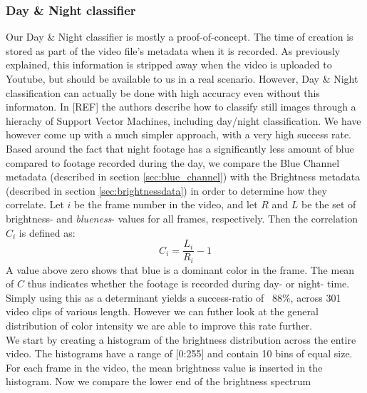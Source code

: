 \subsubsection{Day \& Night classifier}\label{sec:daynightclassifier}
%
Our Day \& Night classifier is mostly a proof-of-concept. The time of creation is stored as part of the video file's metadata when it is recorded. As previously explained, this information is stripped away when the video is uploaded to Youtube, but should be available to us in a real scenario. However, Day \& Night classification can actually be done with high accuracy even without this informaton. In [REF] the authors describe how to classify still images through a hierachy of Support Vector Machines, including day/night classification. We have however come up with a much simpler approach, with a very high success rate.\\
Based around the fact that night footage has a significantly less amount of blue compared to footage recorded during the day, we compare the Blue Channel metadata (described in section \ref{sec:blue_channel}) with the Brightness metadata (described in section \ref{sec:brightnessdata}) in order to determine how they correlate. Let $i$ be the frame number in the video, and let $R$ and $L$ be the set of brightness- and \textit{blueness}- values for all frames, respectively. Then the correlation $C_{i}$ is defined as:\\
%
\begin{equation}
C_{i} = \frac{L_{i}}{R_{i}} - 1
\end{equation}
%
A value above zero shows that blue is a dominant color in the frame. The mean of $C$ thus indicates whether the footage is recorded during day- or night- time. Simply using this as a determinant yields a success-ratio of ~88\%, across 301 video clips of various length.
%
%
However we can futher look at the general distribution of color intensity we are able to improve this rate further.\\
We start by creating a histogram of the brightness distribution across the entire video. The histograms have a range of [0:255] and contain 10 bins of equal size. For each frame in the video, the mean brightness value is inserted in the histogram. Now we compare the lower
%
%
end of the brightness spectrum
%
